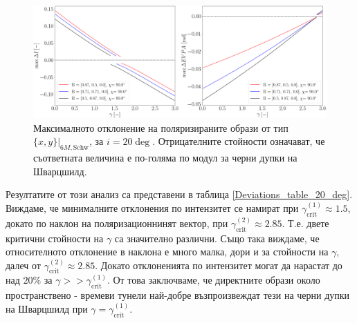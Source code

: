 \begin{figure}[!htb]
		\hspace{-0.5cm}
		\includegraphics[scale = 0.22]{WH_20_deg_param_sweep.png}
		\caption[Максималното отклонение на поляризираните образи от тип $\{x,y\}\vert_{6M, \text{Schw}}$, за $i = 20\deg$]{Максималното отклонение на поляризираните образи от тип $\{x,y\}\vert_{6M, \text{Schw}}$, за $i = 20\deg$. Отрицателните стойности означават, че съответната величина е по-голяма по модул за черни дупки на Шварцшилд.} 
		\label{WH_max_deviation_20_deg}
\end{figure}
 Резултатите от този анализ са представени в таблица \ref{Deviations_table_20_deg}. Виждаме, че минималните отклонения по интензитет се намират при $\gamma_\text{crit}^{(1)}\approx 1.5$, докато по наклон на поляризационнинят вектор, при $\gamma_\text{crit}^{(2)}\approx 2.85$. Т.е. двете критични стойности на $\gamma$ са значително различни. Също така виждаме, че относителното отклонение в наклона е много малка, дори и за стойности на $\gamma$, далеч от $\gamma_\text{crit}^{(2)}\approx 2.85$. Докато отклоненията по интензитет могат да нарастат до над $20\%$ за $\gamma >> \gamma_\text{crit}^{(1)}$. От това заключваме, че директните образи около пространствено - времеви тунели най-добре възпроизвеждат тези на черни дупки на Шварцшилд при $\gamma = \gamma_\text{crit}^{(1)}$.
